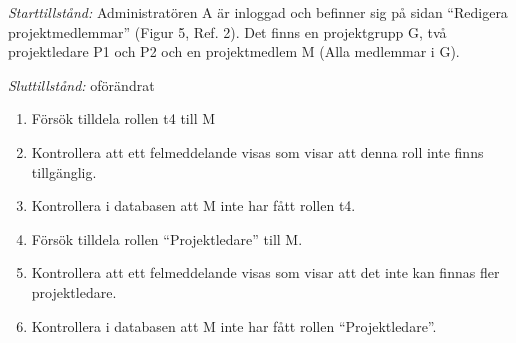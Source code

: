 \documentclass[a4paper]{article}
\begin{document}
\begin{FT}
\emph{Starttillstånd:} Administratören A är inloggad och befinner sig på sidan ``Redigera projektmedlemmar'' (Figur 5, Ref. 2). Det finns en projektgrupp G, två projektledare P1 och P2 och en projektmedlem M (Alla medlemmar i G).

\emph{Sluttillstånd:} oförändrat

\begin{enumerate}
\item Försök tilldela rollen t4 till M
\item Kontrollera att ett felmeddelande visas som visar att denna roll inte finns tillgänglig.
\item Kontrollera i databasen att M inte har fått rollen t4.
\item Försök tilldela rollen ``Projektledare'' till M.
\item Kontrollera att ett felmeddelande visas som visar att det inte kan finnas fler projektledare.
\item Kontrollera i databasen att M inte har fått rollen ``Projektledare''.
\end{enumerate}

%
%
%
\end{FT}
\end{document}
